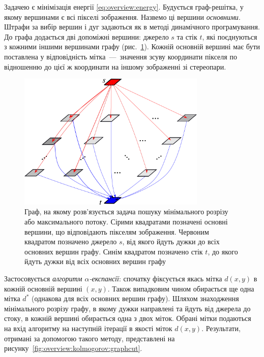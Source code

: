 Задачею є мінімізація енергії \eqref{eq:overview:energy}.
Будується граф-решітка, у якому вершинами є всі пікселі зображення.
Назвемо ці вершини \textit{основними}.
Штрафи за вибір вершин і дуг задаються як в методі динамічного програмування.
До графа додається дві допоміжні вершини: джерело $s$ та стік $t$,
які поєднуються з кожними іншими вершинами графу (рис.~\ref{fig:maxflow:graph}).
Кожній основній вершині має бути поставлена у відповідність
мітка~---~значення зсуву координати пікселя по відношенню до цієї ж координати
на іншому зображенні зі стереопари.

\begin{figure}[h]
  \centering
  \includegraphics[width=0.8\textwidth]{images/maxflow_graph}
  \caption{Граф, на якому розв'язується задача пошуку мінімального розрізу
           або максимального потоку.
           Сірими квадратами позначені основні вершини,
           що відповідають пікселям зображення.
           Червоним квадратом позначено джерело $s$,
           від якого йдуть дужки до всіх основних вершин графу.
           Синім квадратом позначено стік $t$,
           до якого йдуть дужки від всіх основних вершин графу}
  \label{fig:maxflow:graph}
\end{figure}

Застосовується \textit{алгоритм $\alpha$-експансії}:
спочатку фіксується якась мітка $d \left(x, y \right)$ в кожній основній вершині
$\left(x, y \right)$.
Також випадковим чином обирається ще одна мітка $d^*$
(однакова для всіх основних вершин графу).
Шляхом знаходження мінімального розрізу графу,
в якому дужки направлені та йдуть від джерела до стоку,
в кожній вершині обирається одна з двох міток.
Обрані мітки подаються на вхід алгоритму на наступній ітерації в якості міток
$d \left(x, y \right)$.
Результати, отримані за допомогою такого методу,
представлені на рисунку~\ref{fig:overview:kolmogorov:graphcut}.

